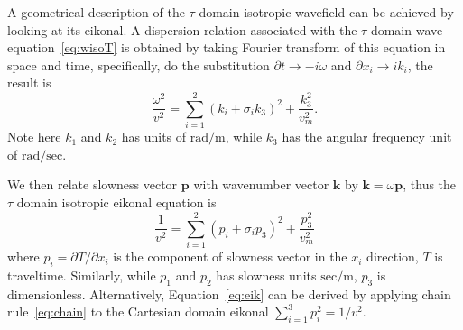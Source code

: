 
A geometrical description of the $\tau$ domain isotropic wavefield can be achieved by looking at its eikonal. A dispersion relation associated with the $\tau$ domain wave equation~\ref{eq:wisoT} is obtained by taking Fourier transform of this equation in space and time, specifically, do the substitution $\partial t \rightarrow -i\omega$ and $\partial x_i \rightarrow i k_i$, the result is
\begin{equation}
\label{eq:wk}
\frac{\omega^2}{v^2} = \sum_{i=1}^2 \left(k_i + \sigma_i k_3\right)^2 + \frac{k_3^2}{v_m^2} .
\end{equation}
Note here $k_1$ and $k_2$ has units of $\mathrm{rad/m}$, while $k_3$ has the angular frequency unit of $\mathrm{rad/sec}$.

We then relate slowness vector $\mathbf{p}$ with wavenumber vector $\mathbf{k}$ by $\mathbf{k} = \omega \mathbf{p}$, thus the $\tau$ domain isotropic eikonal equation is
\begin{equation}
\label{eq:eik}
\frac{1}{v^2} = \sum_{i=1}^2 \left(p_i + \sigma_i p_3\right)^2 + \frac{p_3^2}{v_m^2}
\end{equation}
where $p_i = \partial T / \partial x_i$ is the component of slowness vector in the $x_i$ direction, $T$ is traveltime.
Similarly, while $p_1$ and $p_2$ has slowness units $\mathrm{sec/m}$, $p_3$ is dimensionless.
Alternatively, Equation~\ref{eq:eik} can be derived by applying chain rule~\ref{eq:chain} to the Cartesian domain eikonal $\sum_{i=1}^3 p_i^2 = 1/v^2$.


